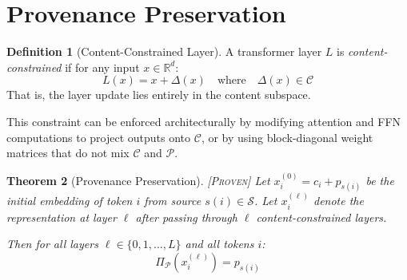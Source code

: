 \documentclass[11pt,a4paper]{article}
\theoremstyle{plain}
\newtheorem{theorem}{Theorem}[section]
\theoremstyle{definition}
\newtheorem{definition}[theorem]{Definition}
\theoremstyle{remark}
\newcommand{\R}{\mathbb{R}}
\newcommand{\Cspace}{\mathcal{C}}
\newcommand{\Pspace}{\mathcal{P}}
\newcommand{\Sclass}{\mathcal{S}}
\newcommand{\proj}[1]{\Pi_{#1}}
\newcommand{\proven}{\textsc{[Proven]}}
\begin{document}
\section{Provenance Preservation}

\begin{definition}[Content-Constrained Layer] \label{def:constrained}
A transformer layer $L$ is \emph{content-constrained} if for any input $x \in \R^d$:
\begin{equation}
L(x) = x + \Delta(x) \quad \text{where} \quad \Delta(x) \in \Cspace
\end{equation}
That is, the layer update lies entirely in the content subspace.
\end{definition}

This constraint can be enforced architecturally by modifying attention and FFN computations to project outputs onto $\Cspace$, or by using block-diagonal weight matrices that do not mix $\Cspace$ and $\Pspace$.

\begin{theorem}[Provenance Preservation] \label{thm:preservation} \proven
Let $x_i^{(0)} = c_i + p_{s(i)}$ be the initial embedding of token $i$ from source $s(i) \in \Sclass$. Let $x_i^{(\ell)}$ denote the representation at layer $\ell$ after passing through $\ell$ content-constrained layers.

Then for all layers $\ell \in \{0, 1, \ldots, L\}$ and all tokens $i$:
\begin{equation}
\proj{\Pspace}(x_i^{(\ell)}) = p_{s(i)}
\end{equation}
\end{theorem}
\end{document}
